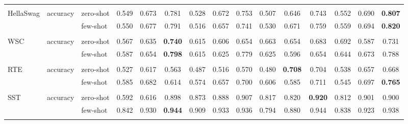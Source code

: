 \documentclass{article}
\begin{document}
\begin{table}[t]
\begin{tabular}{lll<{\hspace{0.8 ex}}>{\hspace{0.8 ex}}ccc<{\hspace{0.8 ex}}>{\hspace{0.8 ex}}ccc<{\hspace{0.8 ex}}>{\hspace{0.8 ex}}ccc<{\hspace{0.8 ex}}>{\hspace{0.8 ex}}ccc<{\hspace{0.8 ex}}}
                           &             &               &       &       &       &        &        &       &        &       &       &        &        &       \\
    HellaSwag              & accuracy    & zero-shot     & 0.549 & 0.673 & 0.781 &  0.528 &  0.672 & 0.753 &  0.507 & 0.646 & 0.743 &  0.552 &  0.690 & \textbf{0.807}  \\
                           &             & few-shot      & 0.550 & 0.677 & 0.791 &  0.516 &  0.657 & 0.741 &  0.530 & 0.671 & 0.759 &  0.559 &  0.694 & \textbf{0.820}  \\
                           &             &               &       &       &       &        &        &       &        &       &       &        &        &       \\
    WSC                    & accuracy    & zero-shot     & 0.567 & 0.635 & \textbf{0.740} &  0.615 &  0.606 & 0.654 &  0.663 & 0.654 & 0.683 &  0.692 &  0.587 & 0.731 \\
                           &             & few-shot      & 0.587 & 0.654 & \textbf{0.798} &  0.615 &  0.625 & 0.779 &  0.625 & 0.596 & 0.654 &  0.644 &  0.673 & 0.788 \\
                           &             &               &       &       &       &        &        &       &        &       &       &        &        &       \\
    RTE                    & accuracy    & zero-shot     & 0.527 & 0.617 & 0.563 &  0.487 &  0.516 & 0.570 &  0.480 & \textbf{0.708} & 0.704 &  0.538 &  0.657 & 0.668 \\
                           &             & few-shot      & 0.585 & 0.682 & 0.614 &  0.574 &  0.657 & 0.700 &  0.606 & 0.585 & 0.711 &  0.545 &  0.697 & \textbf{0.765}  \\
                           &             &               &       &       &       &        &        &       &        &       &       &        &        &       \\
    SST                    & accuracy    & zero-shot     & 0.592 & 0.616 & 0.898 &  0.873 &  0.888 & 0.907 &  0.817 & 0.820 & \textbf{0.920} &  0.812 &  0.901 & 0.900 \\
                           &             & few-shot      & 0.842 & 0.930 & \textbf{0.944} &  0.909 &  0.933 & 0.936 &  0.794 & 0.880 & 0.944 &  0.838 &  0.923 & 0.938 \\
                           &             &               &       &       &       &        &        &       &        &       &       &        &        &       \\

\end{tabular}
\end{table}
\end{document}

